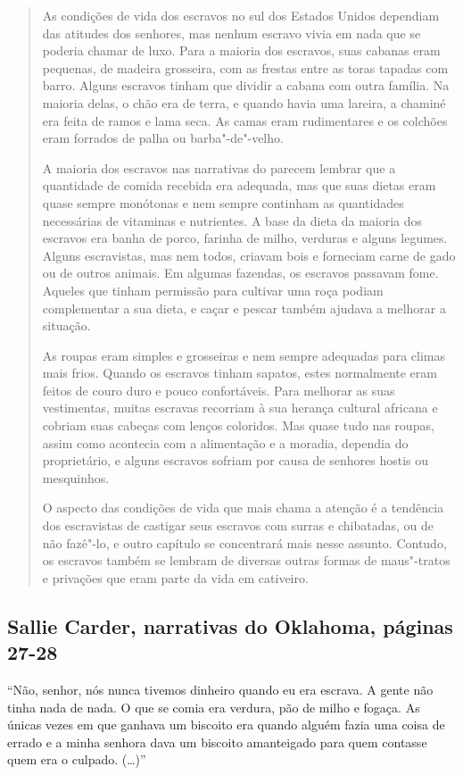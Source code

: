 \begin{quote}
As condições de vida dos escravos no sul dos Estados Unidos
dependiam das atitudes dos senhores, mas nenhum escravo vivia em nada
que se poderia chamar de luxo. Para a maioria dos escravos, suas cabanas
eram pequenas, de madeira grosseira, com as frestas entre as toras
tapadas com barro. Alguns escravos tinham que dividir a cabana com outra
família. Na maioria delas, o chão era de terra, e quando havia uma
lareira, a chaminé era feita de ramos e lama seca. As camas eram
rudimentares e os colchões eram forrados de palha ou barba"-de"-velho.

A maioria dos escravos nas narrativas do  parecem lembrar que a
quantidade de comida recebida era adequada, mas que suas dietas eram
quase sempre monótonas e nem sempre continham as quantidades necessárias
de vitaminas e nutrientes. A base da dieta da maioria dos escravos era
banha de porco, farinha de milho, verduras e alguns legumes. Alguns
escravistas, mas nem todos, criavam bois e forneciam carne de gado ou de
outros animais. Em algumas fazendas, os escravos passavam fome. Aqueles
que tinham permissão para cultivar uma roça podiam complementar a sua
dieta, e caçar e pescar também ajudava a melhorar a situação.

As roupas eram simples e grosseiras e nem sempre adequadas para
climas mais frios. Quando os escravos tinham sapatos, estes normalmente
eram feitos de couro duro e pouco confortáveis. Para melhorar as suas
vestimentas, muitas escravas recorriam à sua herança cultural africana e
cobriam suas cabeças com lenços coloridos. Mas quase tudo nas roupas,
assim como acontecia com a alimentação e a moradia, dependia do
proprietário, e alguns escravos sofriam por causa de senhores hostis ou
mesquinhos.

O aspecto das condições de vida que mais chama a atenção é a
tendência dos escravistas de castigar seus escravos com surras e
chibatadas, ou de não fazê"-lo, e outro capítulo se concentrará mais
nesse assunto. Contudo, os escravos também se lembram de diversas outras
formas de maus"-tratos e privações que eram parte da vida em cativeiro.
\end{quote}

\subsection{Sallie Carder, narrativas do Oklahoma, páginas 27-28} \label{ref48}

``Não, senhor, nós nunca tivemos dinheiro quando eu era escrava. A gente
não tinha nada de nada. O que se comia era verdura, pão de milho e
fogaça. As únicas vezes em que ganhava um biscoito era quando alguém
fazia uma coisa de errado e a minha senhora dava um biscoito amanteigado
para quem contasse quem era o culpado. (\ldots{})''

